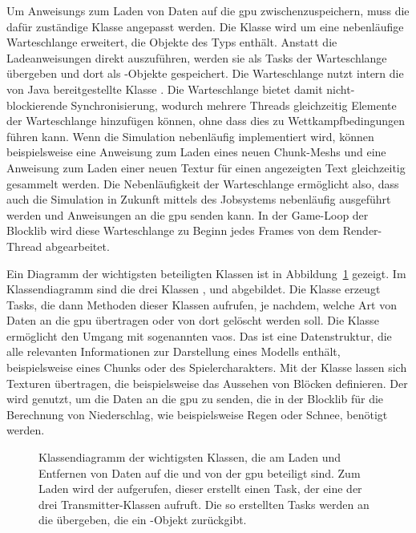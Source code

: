 Um \glspl{Anweisung} zum Laden von Daten auf die \ac{gpu} zwischenzuspeichern, muss die dafür zuständige Klasse \classLoader{} angepasst werden. Die Klasse wird um eine nebenläufige Warteschlange erweitert, die Objekte des Typs \classRunnable{} enthält. Anstatt die Ladeanweisungen direkt auszuführen, werden sie als Tasks der Warteschlange übergeben und dort als \classRunnable{}-Objekte gespeichert. Die Warteschlange nutzt intern die von Java bereitgestellte Klasse \classConcurrentLinkedQueue{}. Die Warteschlange bietet damit nicht-blockierende Synchronisierung, wodurch mehrere Threads gleichzeitig Elemente der Warteschlange hinzufügen können, ohne dass dies zu Wettkampfbedingungen führen kann. Wenn die Simulation nebenläufig implementiert wird, können beispielsweise eine Anweisung zum Laden eines neuen Chunk-Meshs und eine Anweisung zum Laden einer neuen Textur für einen angezeigten Text gleichzeitig gesammelt werden. Die Nebenläufigkeit der Warteschlange ermöglicht also, dass auch die Simulation in Zukunft mittels des Jobsystems nebenläufig ausgeführt werden und Anweisungen an die \ac{gpu} senden kann. In der Game-Loop der Blocklib wird diese Warteschlange zu Beginn jedes Frames von dem Render-Thread abgearbeitet.

Ein Diagramm der wichtigsten beteiligten Klassen ist in Abbildung~\ref{fig:loaderDiagram} gezeigt. Im Klassendiagramm sind die drei Klassen \classVAOTransmitter{}, \classTextureTransmitter{} und \classDataTransmitter{} abgebildet. Die Klasse \classLoader{} erzeugt Tasks, die dann Methoden dieser Klassen aufrufen, je nachdem, welche Art von Daten an die \ac{gpu} übertragen oder von dort gelöscht werden soll. Die Klasse \classVAOTransmitter{} ermöglicht den Umgang mit sogenannten \acp{vao}. Das ist eine Datenstruktur, die alle relevanten Informationen zur Darstellung eines Modells enthält, beispielsweise eines Chunks oder des Spielercharakters. Mit der Klasse \classTextureTransmitter{} lassen sich Texturen übertragen, die beispielsweise das Aussehen von Blöcken definieren. Der \classDataTransmitter{} wird genutzt, um die Daten an die \ac{gpu} zu senden, die in der Blocklib für die Berechnung von Niederschlag, wie beispielsweise Regen oder Schnee, benötigt werden.

\begin{figure}[htbp]
	\centering
	
	\caption[Klassendiagramm der wichtigsten Klassen, die am Laden und Entfernen von Daten auf die und von der  beteiligt sind.]{Klassendiagramm der wichtigsten Klassen, die am Laden und Entfernen von Daten auf die und von der \ac{gpu} beteiligt sind. Zum Laden wird der \classLoader{} aufgerufen, dieser erstellt einen Task, der eine der drei Transmitter-Klassen aufruft. Die so erstellten Tasks werden an die \classDoubleBufferedAsyncQueue{} übergeben, die ein \classCompletableFuture{}-Objekt zurückgibt.}\label{fig:loaderDiagram}
\end{figure}

